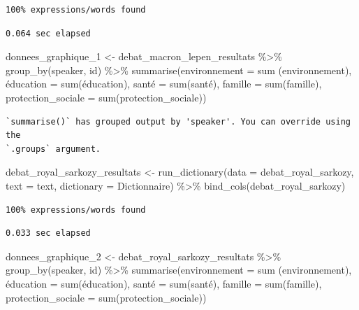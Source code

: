 \documentclass[
  letterpaper,
  DIV=11,
  numbers=noendperiod]{scrartcl}
\newenvironment{Shaded}{\begin{snugshade}}{\end{snugshade}}
\newcommand{\AttributeTok}[1]{\textcolor[rgb]{0.40,0.45,0.13}{#1}}
\newcommand{\FunctionTok}[1]{\textcolor[rgb]{0.28,0.35,0.67}{#1}}
\newcommand{\NormalTok}[1]{\textcolor[rgb]{0.00,0.23,0.31}{#1}}
\newcommand{\OtherTok}[1]{\textcolor[rgb]{0.00,0.23,0.31}{#1}}
\newcommand{\SpecialCharTok}[1]{\textcolor[rgb]{0.37,0.37,0.37}{#1}}
\begin{document}
\begin{verbatim}
100% expressions/words found
\end{verbatim}

\begin{verbatim}
0.064 sec elapsed
\end{verbatim}

\begin{Shaded}
\begin{Highlighting}[]
\NormalTok{donnees\_graphique\_1 }\OtherTok{\textless{}{-}}\NormalTok{ debat\_macron\_lepen\_resultats }\SpecialCharTok{\%\textgreater{}\%} \FunctionTok{group\_by}\NormalTok{(speaker, id) }\SpecialCharTok{\%\textgreater{}\%} \FunctionTok{summarise}\NormalTok{(}\AttributeTok{environnement =} \FunctionTok{sum}\NormalTok{ (environnement), é}\AttributeTok{ducation =} \FunctionTok{sum}\NormalTok{(éducation), santé }\OtherTok{=} \FunctionTok{sum}\NormalTok{(santé), }\AttributeTok{famille =} \FunctionTok{sum}\NormalTok{(famille), }\AttributeTok{protection\_sociale =} \FunctionTok{sum}\NormalTok{(protection\_sociale))}
\end{Highlighting}
\end{Shaded}

\begin{verbatim}
`summarise()` has grouped output by 'speaker'. You can override using the
`.groups` argument.
\end{verbatim}

\begin{Shaded}
\begin{Highlighting}[]
\NormalTok{debat\_royal\_sarkozy\_resultats }\OtherTok{\textless{}{-}} \FunctionTok{run\_dictionary}\NormalTok{(}\AttributeTok{data =}\NormalTok{ debat\_royal\_sarkozy, }\AttributeTok{text =}\NormalTok{ text, }\AttributeTok{dictionary =}\NormalTok{ Dictionnaire) }\SpecialCharTok{\%\textgreater{}\%} \FunctionTok{bind\_cols}\NormalTok{(debat\_royal\_sarkozy)}
\end{Highlighting}
\end{Shaded}

\begin{verbatim}
100% expressions/words found
\end{verbatim}

\begin{verbatim}
0.033 sec elapsed
\end{verbatim}

\begin{Shaded}
\begin{Highlighting}[]
\NormalTok{donnees\_graphique\_2 }\OtherTok{\textless{}{-}}\NormalTok{ debat\_royal\_sarkozy\_resultats }\SpecialCharTok{\%\textgreater{}\%} \FunctionTok{group\_by}\NormalTok{(speaker, id) }\SpecialCharTok{\%\textgreater{}\%} \FunctionTok{summarise}\NormalTok{(}\AttributeTok{environnement =} \FunctionTok{sum}\NormalTok{ (environnement), é}\AttributeTok{ducation =} \FunctionTok{sum}\NormalTok{(éducation), santé }\OtherTok{=} \FunctionTok{sum}\NormalTok{(santé), }\AttributeTok{famille =} \FunctionTok{sum}\NormalTok{(famille), }\AttributeTok{protection\_sociale =} \FunctionTok{sum}\NormalTok{(protection\_sociale))}
\end{Highlighting}
\end{Shaded}
\end{document}
